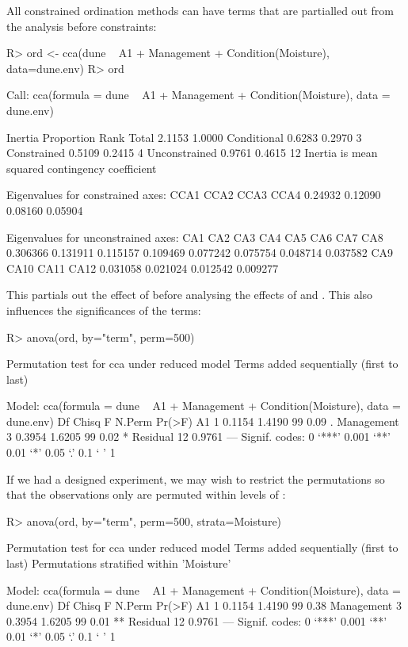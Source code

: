 \documentclass[article,nojss]{jss}
\begin{document}
All constrained ordination methods can have terms that are partialled
out from the analysis before constraints:
\begin{Schunk}
\begin{Sinput}
R> ord <- cca(dune ~ A1 + Management + Condition(Moisture), data=dune.env)
R> ord
\end{Sinput}
\begin{Soutput}
Call: cca(formula = dune ~ A1 + Management +
Condition(Moisture), data = dune.env)

              Inertia Proportion Rank
Total          2.1153     1.0000     
Conditional    0.6283     0.2970    3
Constrained    0.5109     0.2415    4
Unconstrained  0.9761     0.4615   12
Inertia is mean squared contingency coefficient 

Eigenvalues for constrained axes:
   CCA1    CCA2    CCA3    CCA4 
0.24932 0.12090 0.08160 0.05904 

Eigenvalues for unconstrained axes:
     CA1      CA2      CA3      CA4      CA5      CA6      CA7      CA8 
0.306366 0.131911 0.115157 0.109469 0.077242 0.075754 0.048714 0.037582 
     CA9     CA10     CA11     CA12 
0.031058 0.021024 0.012542 0.009277 
\end{Soutput}
\end{Schunk}
This partials out the effect of  before analysing the
effects of  and .  This also influences
the significances of the terms:
\begin{Schunk}
\begin{Sinput}
R> anova(ord, by="term", perm=500)
\end{Sinput}
\begin{Soutput}
Permutation test for cca under reduced model
Terms added sequentially (first to last)

Model: cca(formula = dune ~ A1 + Management + Condition(Moisture), data = dune.env)
           Df  Chisq      F N.Perm Pr(>F)  
A1          1 0.1154 1.4190     99   0.09 .
Management  3 0.3954 1.6205     99   0.02 *
Residual   12 0.9761                       
---
Signif. codes:  0 ‘***’ 0.001 ‘**’ 0.01 ‘*’ 0.05 ‘.’ 0.1 ‘ ’ 1
\end{Soutput}
\end{Schunk}
If we had a designed experiment, we may wish to restrict the
permutations so that the observations only are permuted within levels
of :
\begin{Schunk}
\begin{Sinput}
R> anova(ord, by="term", perm=500, strata=Moisture)
\end{Sinput}
\begin{Soutput}
Permutation test for cca under reduced model
Terms added sequentially (first to last)
Permutations stratified within 'Moisture'

Model: cca(formula = dune ~ A1 + Management + Condition(Moisture), data = dune.env)
           Df  Chisq      F N.Perm Pr(>F)   
A1          1 0.1154 1.4190     99   0.38   
Management  3 0.3954 1.6205     99   0.01 **
Residual   12 0.9761                        
---
Signif. codes:  0 ‘***’ 0.001 ‘**’ 0.01 ‘*’ 0.05 ‘.’ 0.1 ‘ ’ 1
\end{Soutput}
\end{Schunk}

\end{document}
